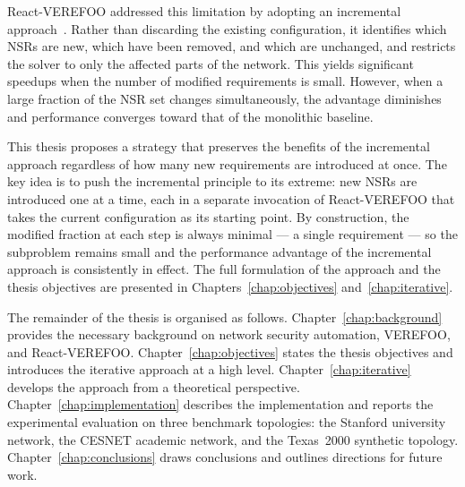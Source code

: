 React-VEREFOO addressed this limitation by adopting an incremental approach~\cite{reactverefoo}. Rather than discarding the existing configuration, it identifies which NSRs are new, which have been removed, and which are unchanged, and restricts the solver to only the affected parts of the network. This yields significant speedups when the number of modified requirements is small. However, when a large fraction of the NSR set changes simultaneously, the advantage diminishes and performance converges toward that of the monolithic baseline.

This thesis proposes a strategy that preserves the benefits of the incremental approach regardless of how many new requirements are introduced at once. The key idea is to push the incremental principle to its extreme: new NSRs are introduced one at a time, each in a separate invocation of React-VEREFOO that takes the current configuration as its starting point. By construction, the modified fraction at each step is always minimal — a single requirement — so the subproblem remains small and the performance advantage of the incremental approach is consistently in effect. The full formulation of the approach and the thesis objectives are presented in Chapters~\ref{chap:objectives} and~\ref{chap:iterative}.

The remainder of the thesis is organised as follows. Chapter~\ref{chap:background} provides the necessary background on network security automation, VEREFOO, and React-VEREFOO. Chapter~\ref{chap:objectives} states the thesis objectives and introduces the iterative approach at a high level. Chapter~\ref{chap:iterative} develops the approach from a theoretical perspective. Chapter~\ref{chap:implementation} describes the implementation and reports the experimental evaluation on three benchmark topologies: the Stanford university network, the CESNET academic network, and the Texas~2000 synthetic topology. Chapter~\ref{chap:conclusions} draws conclusions and outlines directions for future work.
